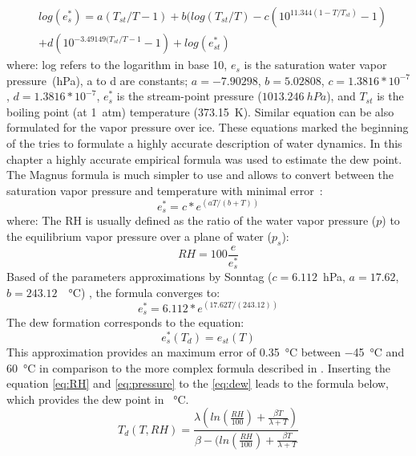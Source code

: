 \begin{equation}
\begin{split}
    &log({e}^{*}_{s}) = a(T_{st}/T - 1) + b(log(T_{st}/T) - c(10^{11.344(1-T/T_{st})} - 1) \\
    &+ d(10^{-3.49149(T_{st}/T - 1} -1) + log(e^{*}_{st})
\end{split}
\end{equation}
where: log refers to the logarithm in base 10, $e_{s}$ is the saturation water vapor pressure~(hPa), a to d are constants; $a = - 7.90298$, $b=5.02808$, $c=1.3816*10^{-7}$, $d=1.3816*10^{-7}$, $e^{*}_{s}$ is the stream-point pressure ($1013.246~hPa$), and $T_{st}$ is the boiling point (at 1~atm) temperature (373.15~K). Similar equation can be also formulated for the vapor pressure over ice. These equations marked the beginning of the tries to formulate a highly accurate description of water dynamics. In this chapter a highly accurate empirical formula was used to estimate the dew point. The Magnus formula is much simpler to use and allows to convert between the saturation vapor pressure and temperature with minimal error~\cite{magnus}: 
\begin{equation}
    e^{*}_{s} = c*e^{(aT/(b+T))}
\end{equation}
where: 
The \gls{RH} is usually defined as the ratio of the water vapor pressure ($p$) to the equilibrium vapor pressure over a plane of water ($p_{s}$):
\begin{equation}
    RH = 100\frac{e}{e^{*}_{s}}
    \label{eq:RH}
\end{equation}
Based of the parameters approximations by Sonntag ($c=6.112$~hPa, $a=17.62$, $b=243.12$~\SI{}{\celsius}) \cite{magnus}, the formula converges to:
\begin{equation}
    e^{*}_{s} = 6.112*e^{(17.62T/(243.12))}
    \label{eq:pressure}
\end{equation}
The dew formation corresponds to the equation:
\begin{equation}
    e^{*}_{s}(T_{d}) = e_{st}(T)
    \label{eq:dew}
\end{equation}
This approximation provides an maximum error of \SI{0.35}{\celsius} between \SI{-45}{\celsius} and \SI{60}{\celsius} in comparison to the more complex formula described in \cite{hardy}. 
Inserting the equation \ref{eq:RH} and \ref{eq:pressure} to the \ref{eq:dew} leads to the formula below, which provides the dew point in \SI{}{\celsius}.
\begin{equation}
    T_{d}(T, RH) = \frac{\lambda(ln(\frac{RH}{100})+\frac{\beta T}{\lambda + T})}{\beta - (ln(\frac{RH}{100})+\frac{\beta T}{\lambda + T}}
    \label{eq:td}
\end{equation}
